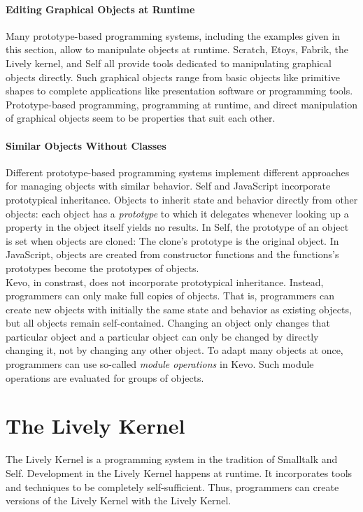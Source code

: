 \paragraph{Editing Graphical Objects at Runtime}
Many prototype-based programming systems, including the examples given in this section, allow to manipulate objects at runtime.
Scratch, Etoys, Fabrik, the Lively kernel, and Self all provide tools dedicated to manipulating graphical objects directly.
Such graphical objects range from basic objects like primitive shapes to complete applications like presentation software or programming tools.
Prototype-based programming, programming at runtime, and direct manipulation of graphical objects seem to be properties that suit each other.

\paragraph{Similar Objects Without Classes}
Different prototype-based programming systems implement different approaches for managing objects with similar behavior.
Self and JavaScript incorporate prototypical inheritance.
Objects to inherit state and behavior directly from other objects: each object has a \emph{prototype} to which it delegates whenever looking up a property in the object itself yields no results.
In Self, the prototype of an object is set when objects are cloned: The clone's prototype is the original object.
In JavaScript, objects are created from constructor functions and the functions's prototypes become the prototypes of objects.\\
Kevo, in constrast, does not incorporate prototypical inheritance.
Instead, programmers can only make full copies of objects.
That is, programmers can create new objects with initially the same state and behavior as existing objects, but all objects remain self-contained.
Changing an object only changes that particular object and a particular object can only be changed by directly changing it, not by changing any other object.
To adapt many objects at once, programmers can use so-called \emph{module operations} in Kevo.
Such module operations are evaluated for groups of objects.


\section{The Lively Kernel}

The Lively Kernel is a programming system in the tradition of Smalltalk and Self.
Development in the Lively Kernel happens at runtime.
It incorporates tools and techniques to be completely self-sufficient.
Thus, programmers can create versions of the Lively Kernel with the Lively Kernel.

